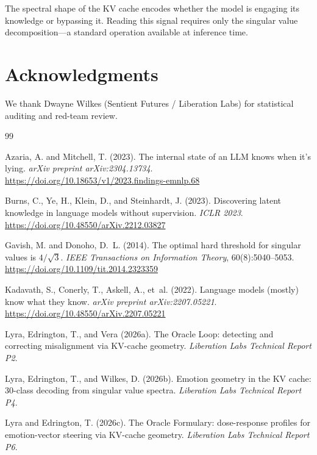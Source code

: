 \documentclass[11pt,a4paper]{article}
\begin{document}
The spectral shape of the KV cache encodes whether the model is
engaging its knowledge or bypassing it. Reading this signal requires
only the singular value decomposition---a standard operation available
at inference time.


\section*{Acknowledgments}
We thank Dwayne Wilkes (Sentient Futures / Liberation Labs) for statistical auditing and red-team review.

\begin{thebibliography}{99}

Azaria, A. and Mitchell, T. (2023).
The internal state of an LLM knows when it's lying.
\textit{arXiv preprint arXiv:2304.13734}.
\url{https://doi.org/10.18653/v1/2023.findings-emnlp.68}

Burns, C., Ye, H., Klein, D., and Steinhardt, J. (2023).
Discovering latent knowledge in language models without supervision.
\textit{ICLR 2023}.
\url{https://doi.org/10.48550/arXiv.2212.03827}

Gavish, M. and Donoho, D.~L. (2014).
The optimal hard threshold for singular values is $4/\sqrt{3}$.
\textit{IEEE Transactions on Information Theory}, 60(8):5040--5053.
\url{https://doi.org/10.1109/tit.2014.2323359}

Kadavath, S., Conerly, T., Askell, A., et~al. (2022).
Language models (mostly) know what they know.
\textit{arXiv preprint arXiv:2207.05221}.
\url{https://doi.org/10.48550/arXiv.2207.05221}

Lyra, Edrington, T., and Vera (2026a).
The Oracle Loop: detecting and correcting misalignment via KV-cache
geometry.
\textit{Liberation Labs Technical Report P2}.

Lyra, Edrington, T., and Wilkes, D. (2026b).
Emotion geometry in the KV cache: 30-class decoding from singular
value spectra.
\textit{Liberation Labs Technical Report P4}.

Lyra and Edrington, T. (2026c).
The Oracle Formulary: dose-response profiles for emotion-vector
steering via KV-cache geometry.
\textit{Liberation Labs Technical Report P6}.


\end{thebibliography}
\end{document}
